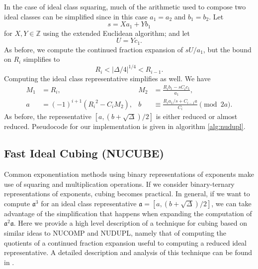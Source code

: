 \documentclass{ucalgthes1}
\theoremstyle{plain}
\theoremstyle{definition}
\newcommand{\ZZ}{\mathbb{Z}}
\begin{document}
In the case of ideal class squaring, much of the arithmetic used to compose two ideal classes can be simplified since in this case $a_1=a_2$ and $b_1=b_2$.  Let 
\[
	s = Xa_1 + Yb_1
\]
for $X,Y \in \ZZ$ using the extended Euclidean algorithm; and let 
\[
	U = Yc_1.
\]
As before, we compute the continued fraction expansion of $sU/a_1$, but the bound on $R_i$ simplifies to
\[
	R_i < |\Delta/4|^{1/4} < R_{i-1}.
\]
Computing the ideal class representative simplifies as well.  We have
\begin{align*}
	M_1 &= R_i, & 
	M_2 &= \frac{R_i b_1 - sC_i c_1}{a_1}, \\
	a &= (-1)^{i+1}({R_i}^2 - C_i M_2), &
	b &\equiv \frac{R_i a_1/s  + C_{i-1} a}{C_i} \pmod{2a}.
\end{align*}
As before, the representative $[a, (b+\sqrt\Delta)/2]$ is either reduced or almost reduced.  \break Pseudocode for our implementation is given in algorithm \ref{alg:nudupl}.


\subsection{Fast Ideal Cubing (NUCUBE)}\label{subsec:nucube}

Common exponentiation methods using binary representations of exponents make use of squaring and multiplication operations.  If we consider binary-ternary representations of exponents, cubing becomes practical.  In general, if we want to compute ${\mathfrak a}^3$ for an ideal class representative $\mathfrak a = [a, (b+\sqrt\Delta)/2]$, we can take advantage of the simplification that happens when expanding the computation of ${\mathfrak a}^2 \mathfrak a$.  Here we provide a high level description of a technique for cubing based on similar ideas to NUCOMP and NUDUPL, namely that of computing the quotients of a continued fraction expansion useful to computing a reduced ideal representative.  A detailed description and analysis of this technique can be found in \cite{Ijs2010}.
\end{document}
